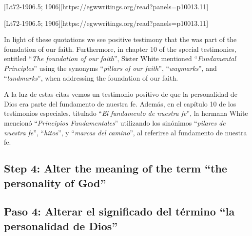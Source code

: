 [Lt72-1906.5; 1906][https://egwwritings.org/read?panels=p10013.11]


[Lt72-1906.5; 1906][https://egwwritings.org/read?panels=p10013.11]


In light of these quotations we see positive testimony that the  was part of the foundation of our faith. Furthermore, in chapter 10 of the special testimonies, entitled “\textit{The foundation of our faith}”, Sister White mentioned “\textit{Fundamental Principles}” using the synonyms “\textit{pillars of our faith}”, “\textit{waymarks}”, and “\textit{landmarks}”, when addressing the foundation of our faith.


A la luz de estas citas vemos un testimonio positivo de que la personalidad de Dios era parte del fundamento de nuestra fe. Además, en el capítulo 10 de los testimonios especiales, titulado “\textit{El fundamento de nuestra fe}”, la hermana White mencionó “\textit{Principios Fundamentales}” utilizando los sinónimos “\textit{pilares de nuestra fe}”, “\textit{hitos}”, y “\textit{marcas del camino}”, al referirse al fundamento de nuestra fe.


\subsection*{Step 4: Alter the meaning of the term “the personality of God”}


\subsection*{Paso 4: Alterar el significado del término “la personalidad de Dios”}



